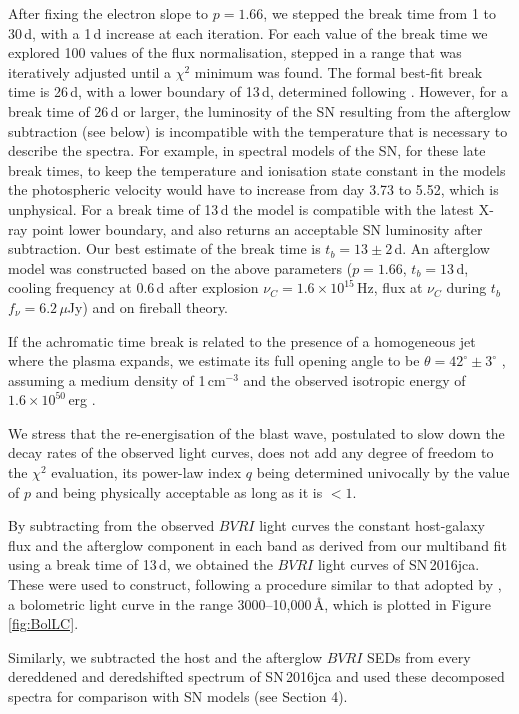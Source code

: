 \documentclass[fleqn,usenatbib]{mnras}
\begin{document}
After fixing the electron slope to $p = 1.66$,  we stepped the break time from 1 to 30\,d, with a 1\,d increase at each iteration.   For each value of the break time we explored 100 values of the flux normalisation,   stepped in a range that was iteratively adjusted until a $\chi^2$ minimum was found.    The formal best-fit break time is 26\,d,  with a lower boundary of 13\,d, determined following \citet{Avni76}.   However,  for  a break time of 26\,d or larger,  the luminosity of the SN resulting from the afterglow subtraction (see below)  is  incompatible with the temperature that is necessary to describe the spectra.  
For example, in spectral models of the SN,  for these late break times, to  keep the temperature and ionisation state constant in the models  the photospheric velocity would have to increase from day 3.73 to 5.52, which is unphysical. For a break time of 13\,d the model is compatible with the latest X-ray point lower boundary, and also returns an acceptable SN luminosity after subtraction.  Our best estimate of the break time is $t_{b} = 13 \pm 2$\,d.    An afterglow model was constructed based on the above parameters ($p = 1.66$,  $t_b = 13$\,d,  cooling frequency at 0.6\,d after explosion $\nu_C = 1.6 \times 10^{15}$\,Hz, flux at $\nu_C$ during $t_b$  $f_\nu =  6.2$\,$\mu$Jy) and on fireball theory.

If the achromatic time break is  related to the presence of a homogeneous jet where the plasma expands,  we estimate its
full opening angle to be $\theta = 42^\circ \pm 3^\circ$ \citep{Sari99},  assuming a
medium density of 1\,cm$^{-3}$ and the observed isotropic energy of $1.6 \times 10^{50}$\,erg \citep{Frederiks17}. 

We stress that the re-energisation of the blast wave, postulated to slow down the decay rates of the observed light curves, does not add any degree of freedom to the $\chi^2$ evaluation, its power-law index $q$ being determined univocally by the value of $p$ and being physically acceptable as long as it is $< 1$.  

By subtracting from the observed $BVRI$ light curves the constant host-galaxy flux and the afterglow component in each band as derived from our multiband fit using a break time of 13\,d, we obtained the $BVRI$ light curves of SN\,2016jca. These were used to construct, following a procedure similar to that adopted by \citet{Mazzali17},  a bolometric light curve in the range 3000--10,000\,\AA, which is plotted in Figure \ref{fig:BolLC}.


Similarly, we subtracted the host and the afterglow $BVRI$ SEDs from every dereddened and deredshifted 
spectrum of SN\,2016jca and used these decomposed spectra for comparison with SN models (see Section 4).
\end{document}
